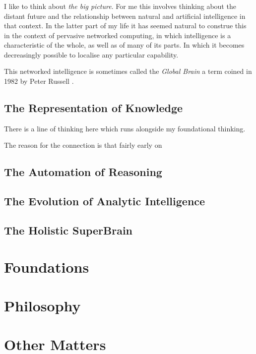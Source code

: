 \documentclass[10pt,titlepage]{book}
\begin{document}
\subsection{}

I like to think about {\it the big picture}.
For me this involves thinking about the distant future and the relationship between natural and artificial intelligence in that context.
In the latter part of my life it has seemed natural to construe this in the context of pervasive networked computing, in which intelligence is a characteristic of the whole, as well as of many of its parts.
In which it becomes decreasingly possible to localise any particular capability.

This networked intelligence is sometimes called the {\it Global Brain} a term coined in 1982 by Peter Russell \cite{russellp82}.

\section{The Representation of Knowledge}

There is a line of thinking here which runs alongside my foundational thinking.

The reason for the connection is that fairly early on 

\section{The Automation of Reasoning}

\section{The Evolution of Analytic Intelligence}

\section{The Holistic SuperBrain}

\chapter{Foundations}

\chapter{Philosophy}

\chapter{Other Matters}
\end{document}
